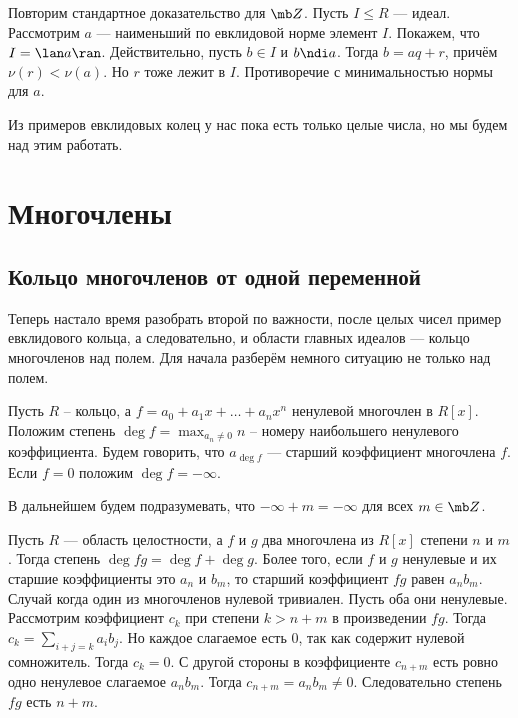 \proof Повторим стандартное доказательство для $\mb Z$. Пусть $I\leq R$ --- идеал. Рассмотрим $a$ --- наименьший по евклидовой норме элемент $I$. Покажем, что $I=\lan a\ran$. Действительно, пусть $b\in I$ и $b\ndi a$. Тогда $b=aq+r$, причём $\nu(r)<\nu(a)$. Но $r$ тоже лежит в $I$. Противоречие с минимальностью нормы для $a$.
\endproof


Из примеров евклидовых колец у нас пока есть только целые числа, но мы будем над этим работать.

















\chapter{Многочлены}



\section{Кольцо многочленов от одной переменной}


Теперь настало время разобрать второй по важности, после целых чисел пример евклидового кольца, а следовательно, и области главных идеалов --- кольцо многочленов над полем. Для начала разберём немного ситуацию не только над полем.

 Пусть $R$ -- кольцо, а $f=a_0+a_1x+\dots+a_nx^n$ ненулевой многочлен в $R[x]$. Положим степень $\deg f = \max_{a_n\neq 0} n$ -- номеру наибольшего ненулевого коэффициента. Будем говорить, что $a_{\deg f}$ --- старший коэффициент многочлена $f$. Если $f=0$ положим $\deg f= -\infty$.
\edfn

\rm В дальнейшем будем подразумевать, что $-\infty+m=-\infty$ для всех $ m \in \mb Z$.
\erm

 Пусть $R$ --- область целостности, а $f$ и $g$ два  многочлена из $R[x]$ степени $n$ и $m$. Тогда степень $\deg fg = \deg f +\deg g$. Более того, если $f$ и $g$ ненулевые и их старшие коэффициенты это $a_n$ и $b_m$, то старший коэффициент $fg$ равен $a_nb_m$.
\elm
\proof Случай когда один из многочленов нулевой тривиален. Пусть оба они ненулевые. Рассмотрим коэффициент $c_k$ при степени $k>n+m$ в произведении $fg$. Тогда $c_k=\sum_{i+j=k}a_ib_j$. Но каждое слагаемое есть 0, так как содержит нулевой сомножитель. Тогда $c_k=0$. С другой стороны в коэффициенте $c_{n+m}$ есть ровно одно ненулевое слагаемое $a_nb_m$. Тогда $c_{n+m}=a_nb_m\neq 0$. Следовательно степень $fg$  есть $n+m$.
\endproof

